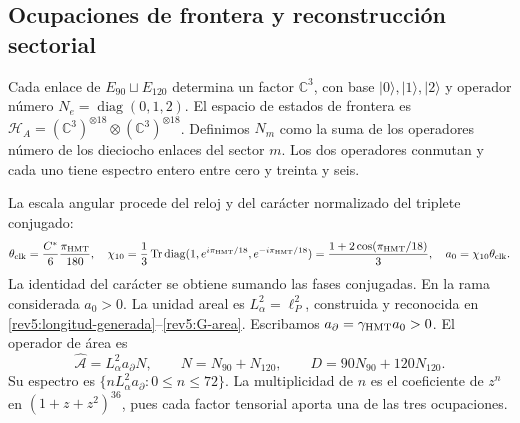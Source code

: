 

\subsection{Ocupaciones de frontera y reconstrucción sectorial}

Cada enlace de \(E_{90}\sqcup E_{120}\) determina un factor
\(\mathbb C^3\), con base \(|0\rangle,|1\rangle,|2\rangle\)
y operador número \(N_e=\operatorname{diag}(0,1,2)\). El espacio de
estados de frontera es
\(\mathscr H_A=(\mathbb C^3)^{\otimes18}\otimes
(\mathbb C^3)^{\otimes18}\). Definimos \(N_m\) como la suma de
los operadores número de los dieciocho enlaces del sector \(m\).
Los dos operadores conmutan y cada uno tiene espectro entero entre
cero y treinta y seis.

La escala angular procede del reloj y del carácter normalizado del
triplete conjugado:
\begin{equation}
 \theta_{\rm clk}=\frac{C^*}{6}\frac{\pi_{\rm HMT}}{180},
 \quad
 \chi_{10}=\frac13\operatorname{Tr}\operatorname{diag}
 (1,e^{i\pi_{\rm HMT}/18},e^{-i\pi_{\rm HMT}/18})
 =\frac{1+2\cos(\pi_{\rm HMT}/18)}3,
 \quad a_0=\chi_{10}\theta_{\rm clk}.
 \label{rev4:ae:escala}
\end{equation}
La identidad del carácter se obtiene sumando las fases conjugadas.
En la rama considerada \(a_0>0\). La unidad areal es
\(L_\alpha^2=\ell_P^2\), construida y reconocida en
\eqref{rev5:longitud-generada}--\eqref{rev5:G-area}. Escribamos
\(a_\partial=\gamma_{\rm HMT}a_0>0\). El operador de área es
\begin{equation}
 \widehat{\mathcal A}=L_\alpha^2a_\partial N,
 \qquad N=N_{90}+N_{120},
 \qquad D=90N_{90}+120N_{120}.
 \label{rev4:ae:area}
\end{equation}
Su espectro es \(\{nL_\alpha^2a_\partial:0\le n\le72\}\).
La multiplicidad de \(n\) es el coeficiente de \(z^n\) en
\((1+z+z^2)^{36}\), pues cada factor tensorial aporta una de
las tres ocupaciones.

